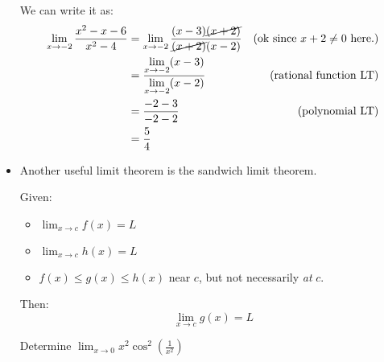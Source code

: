 \begin{itemize}
\begin{example}
        We can write it as:
        \begin{align}
            \lim_{x\to -2} \frac{x^2-x-6}{x^2-4} &= \lim_{x\to -2} \frac{(x-3)\cancel{(x+2)}}{\cancel{(x+2)}(x-2)} & \text{(ok since }x+2\neq 0\text{ here.)} \\ 
            &= \frac{\displaystyle\lim_{x\to -2} (x-3)}{\displaystyle\lim_{x\to -2}(x-2)} & \text{(rational function LT)} \\ 
            &= \frac{-2-3}{-2-2} & \text{(polynomial LT)} \\ 
            &= \frac{5}{4}
        \end{align}
    \end{example}
    \item Another useful limit theorem is the sandwich limit theorem.
    \begin{theorem}
        Given:
        \begin{itemize}
            \item $\displaystyle \lim_{x\to c}f(x)=L$
            \item $\displaystyle \lim_{x\to c}h(x)=L$
            \item $f(x) \le g(x) \le h(x)$ near $c$, but not necessarily \textit{at} $c$.
        \end{itemize}
        Then:
        \begin{equation}
            \lim_{x\to c}g(x)=L
            \label{eq:}
        \end{equation}
    \end{theorem}
    \begin{example}
        Determine $\displaystyle \lim_{x\to 0} x^2\cos^2\left(\frac{1}{x^2}\right)$
        \vspace{2mm}


\end{example}
\end{itemize}
